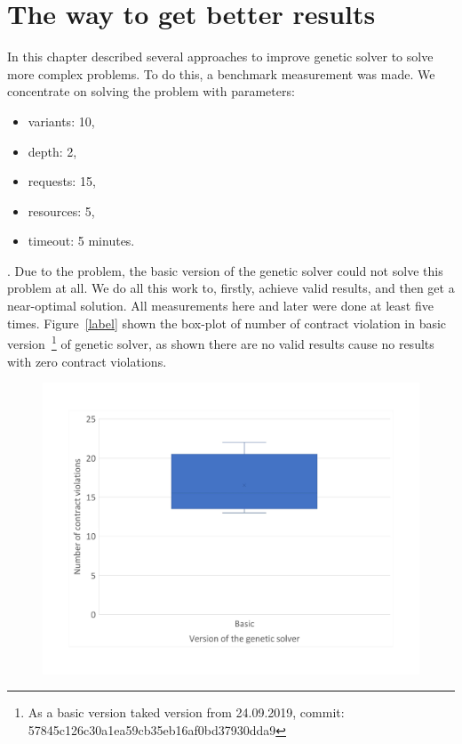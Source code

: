 \chapter{The way to get better results}
In this chapter described several approaches to improve genetic solver to solve more complex problems.
To do this, a benchmark measurement was made.
We concentrate on solving the problem with parameters:
\begin{itemize}
	\item variants: 10,
	\item depth: 2,
	\item requests: 15,
	\item resources: 5,
	\item timeout: 5 minutes.
\end{itemize}.
Due to the problem, the basic version of the genetic solver could not solve this problem at all. We do all this work to, firstly, achieve valid results, and then get a near-optimal solution. 
All measurements here and later were done at least five times. 
Figure~\ref{label} shown the box-plot of number of contract violation in basic version~\footnote{As a basic version taked version from 24.09.2019, commit: 57845c126c30a1ea59cb35eb16af0bd37930dda9} of genetic solver, as shown there are no valid results cause no results with zero contract violations.

\begin{figure}
	\centering
	\includegraphics[width=\textwidth]{images/BoxPlotSolverBasic}
	\caption[Boxplot with a number of contract violations for the basic version of genetic solver]{}
	\label{fig:boxplotsolverbasic}
\end{figure}


